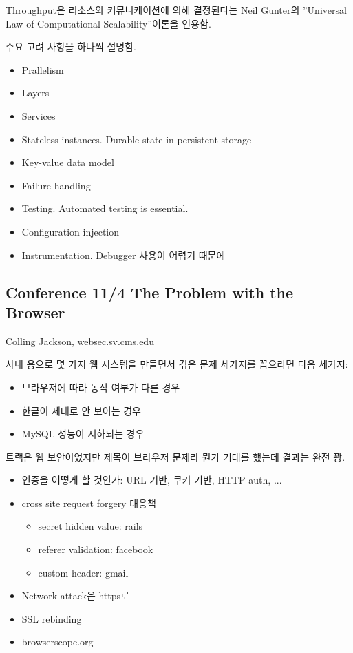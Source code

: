 \documentclass[a4paper]{article}
\begin{document}
Throughput은 리소스와 커뮤니케이션에 의해 결정된다는 Neil Gunter의
”Universal Law of Computational Scalability”이론을 인용함.
 
주요 고려 사항을 하나씩 설명함.
 
\begin{itemize}
\item Prallelism
\item Layers
\item Services
\item Stateless instances. Durable state in persistent storage
\item Key-value data model
\item Failure handling
\item Testing. Automated testing is essential.
\item Configuration injection
\item Instrumentation. Debugger 사용이 어렵기 때문에
\end{itemize}
 
\subsection{Conference 11/4 The Problem with the Browser}
 
Colling Jackson, websec.sv.cms.edu
 
사내 용으로 몇 가지 웹 시스템을 만들면서 겪은 문제 세가지를 꼽으라면 다음 
세가지:
\begin{itemize}
\item 브라우저에 따라 동작 여부가 다른 경우
\item 한글이 제대로 안 보이는 경우
\item MySQL 성능이 저하되는 경우
\end{itemize}
 
트랙은 웹 보안이었지만 제목이 브라우저 문제라 뭔가 기대를 했는데 결과는 완전 꽝.
 
\begin{itemize}
\item 인증을 어떻게 할 것인가: URL 기반, 쿠키 기반, HTTP auth, ...
\item cross site request forgery 대응책
    \begin{itemize}
    \item secret hidden value: rails
    \item referer validation: facebook
    \item custom header: gmail
    \end{itemize}
\item Network  attack은 https로 
\item SSL rebinding
\item browserscope.org 
\end{itemize}
 
\end{document}
